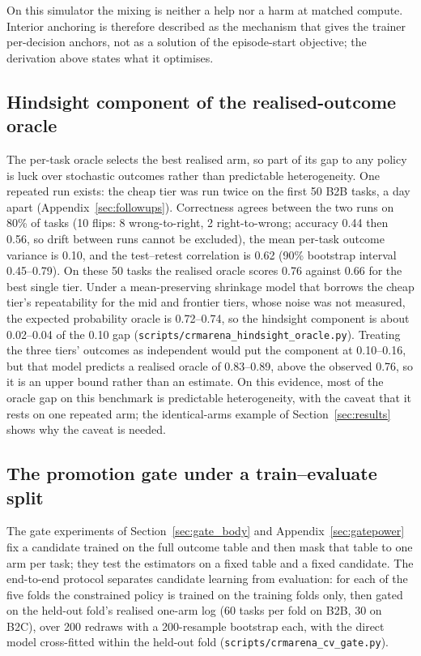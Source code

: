 \documentclass[10pt]{article}
\newcommand{\code}[1]{\texttt{#1}}
\begin{document}
On this simulator the mixing is neither a help nor a harm at matched compute. Interior anchoring is therefore described as the mechanism that gives the trainer per-decision anchors, not as a solution of the episode-start objective; the derivation above states what it optimises.

\subsection{Hindsight component of the realised-outcome oracle}
\label{app:hindsight}

The per-task oracle selects the best realised arm, so part of its gap to any policy is luck over stochastic outcomes rather than predictable heterogeneity. One repeated run exists: the cheap tier was run twice on the first 50 B2B tasks, a day apart (Appendix~\ref{sec:followups}). Correctness agrees between the two runs on 80\% of tasks (10 flips: 8 wrong-to-right, 2 right-to-wrong; accuracy 0.44 then 0.56, so drift between runs cannot be excluded), the mean per-task outcome variance is 0.10, and the test--retest correlation is 0.62 (90\% bootstrap interval 0.45--0.79). On these 50 tasks the realised oracle scores 0.76 against 0.66 for the best single tier. Under a mean-preserving shrinkage model that borrows the cheap tier's repeatability for the mid and frontier tiers, whose noise was not measured, the expected probability oracle is 0.72--0.74, so the hindsight component is about 0.02--0.04 of the 0.10 gap (\code{scripts/crmarena\_hindsight\_oracle.py}). Treating the three tiers' outcomes as independent would put the component at 0.10--0.16, but that model predicts a realised oracle of 0.83--0.89, above the observed 0.76, so it is an upper bound rather than an estimate. On this evidence, most of the oracle gap on this benchmark is predictable heterogeneity, with the caveat that it rests on one repeated arm; the identical-arms example of Section~\ref{sec:results} shows why the caveat is needed.

\subsection{The promotion gate under a train--evaluate split}
\label{app:cvgate}

The gate experiments of Section~\ref{sec:gate_body} and Appendix~\ref{sec:gatepower} fix a candidate trained on the full outcome table and then mask that table to one arm per task; they test the estimators on a fixed table and a fixed candidate. The end-to-end protocol separates candidate learning from evaluation: for each of the five folds the constrained policy is trained on the training folds only, then gated on the held-out fold's realised one-arm log (60 tasks per fold on B2B, 30 on B2C), over 200 redraws with a 200-resample bootstrap each, with the direct model cross-fitted within the held-out fold (\code{scripts/crmarena\_cv\_gate.py}).
\end{document}
